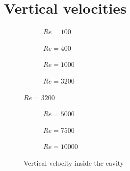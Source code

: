 \section{Vertical velocities}
\begin{figure}[H]
	\centering
	\begin{subfigure}{0.5\textwidth}
		\resizebox{1.4\textwidth}{!}{}
		\caption{$Re=100$}
	\end{subfigure}%
	\begin{subfigure}{0.5\textwidth}
		\resizebox{1.4\textwidth}{!}{}
		\caption{$Re=400$}
	\end{subfigure}
	\begin{subfigure}{0.5\textwidth}
		\resizebox{1.4\textwidth}{!}{}
		\caption{$Re=1000$}
	\end{subfigure}%
	\begin{subfigure}{0.5\textwidth}
		\resizebox{1.4\textwidth}{!}{}
		\caption{$Re=3200$}
	\end{subfigure}
\end{figure}
\begin{figure}\ContinuedFloat
	\begin{subfigure}{0.5\textwidth}
		\resizebox{1.4\textwidth}{!}{}
		\caption{$Re=5000$}
	\end{subfigure}%
	\begin{subfigure}{0.5\textwidth}
		\resizebox{1.4\textwidth}{!}{}
		\caption{$Re=7500$}
	\end{subfigure}
	\begin{subfigure}{0.5\textwidth}
		\resizebox{1.4\textwidth}{!}{}
		\caption{$Re=10000$}
	\end{subfigure}
	\caption{Vertical velocity inside the cavity}
\end{figure}


